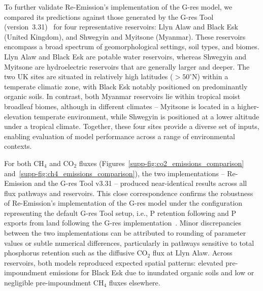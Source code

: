 \documentclass[10pt]{article}
\begin{document}
To further validate Re-Emission's implementation of the G-res model, we compared its predictions against those generated by the G-res Tool (version~3.31)~\citep{prairie2017gres} for four representative reservoirs: Llyn Alaw and Black Esk (United Kingdom), and Shwegyin and Myitsone (Myanmar). 
These reservoirs encompass a broad spectrum of geomorphological settings, soil types, and biomes. 
Llyn Alaw and Black Esk are potable water reservoirs, whereas Shwegyin and Myitsone are hydroelectric reservoirs that are generally larger and deeper. 
The two UK sites are situated in relatively high latitudes ($>50^{\circ}$N) within a temperate climatic zone, with Black Esk notably positioned on predominantly organic soils. 
In contrast, both Myanmar reservoirs lie within tropical moist broadleaf biomes, although in different climates -- Myitsone is located in a higher-elevation temperate environment, while Shwegyin is positioned at a lower altitude under a tropical climate. 
Together, these four sites provide a diverse set of inputs, enabling evaluation of model performance across a range of environmental contexts. 

For both CH$_{4}$ and CO$_{2}$ fluxes (Figures~\ref{supp-fig:co2_emissions_comparison} and~\ref{supp-fig:ch4_emissions_comparison}), the two implementations -- Re-Emission and the G-res Tool v3.31 -- produced near-identical results across all flux pathways and reservoirs.
This close correspondence confirms the robustness of Re-Emission's implementation of the G-res model under the configuration representing the default G-res Tool setup, i.e., \ac{P} retention following \citet{larsen1976} and \ac{P} exports from land following the G-res implementation~\citep{Prairie1986,Prairie2021}.
Minor discrepancies between the two implementations can be attributed to rounding of parameter values or subtle numerical differences, particularly in pathways sensitive to total phosphorus retention such as the diffusive CO$_{2}$ flux at Llyn Alaw.
Across reservoirs, both models reproduced expected spatial patterns: elevated pre-impoundment emissions for Black Esk due to inundated organic soils and low or negligible pre-impoundment CH$_{4}$ fluxes elsewhere.
\end{document}
